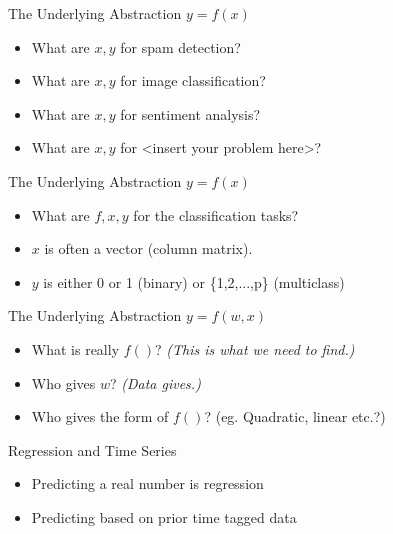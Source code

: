 \documentclass[aspectratio=169, 14pt,usenames,dvipsnames]{beamer}
\begin{document}
\begin{frame}{The Underlying Abstraction} 
\centering
\textsl{\alert{\Huge{$y = f(x)$}}}
\begin{itemize} \vspace{12pt}
\item What are \alert{$x,y$} for spam detection?
\item What are \alert{$x,y$} for image classification? 
\item What are \alert{$x,y$} for sentiment analysis?
\item What are \alert{$x,y$} for \textless insert your problem here\textgreater?
\end{itemize}
\end{frame}


\begin{frame}{The Underlying Abstraction}
\centering
\textsl{\alert{\Huge{$y = f(x)$}}}
\begin{itemize} \vspace{12pt}
\item What are \alert{$f,x,y$} for the classification tasks? \vspace{4pt}
\item \alert{$x$} is often a vector (column matrix). \vspace{4pt}
\item \alert{$y$} is either 0 or 1 (binary) or \{1,2,...,p\} (multiclass) \vspace{4pt}
\end{itemize}
\end{frame}

\begin{frame}{The Underlying Abstraction}
\centering
\textsl{\alert{\Huge{$y = f(w, x)$}}}
\begin{itemize} \vspace{12pt}
\item What is really \alert{$f()$}? \textsl{(This is what we need to find.)} \vspace{4pt}
\item Who gives \alert{$w$}? \textsl{(Data gives.)} \vspace{4pt}
\item Who gives the form of \alert{$f()$}? (eg. Quadratic, linear etc.?) \vspace{4pt}
\end{itemize}
\end{frame}

\begin{frame}{Regression and Time Series}
	\only<3->{\vspace{0.21cm}}
	\only<2->{\alert{Regression}}
\begin{itemize}
	\item<2-> Predicting a real number is \vspace{0.5cm} regression
\end{itemize} %
\begin{itemize}
\item<3-> Predicting based on prior time tagged data
\end{itemize}
\end{frame}
\end{document}
